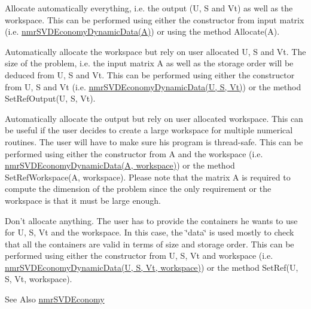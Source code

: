 \begin{DoxyItemize}
\item Allocate automatically everything, i.\-e. the output (U, S and Vt) as well as the workspace. This can be performed using either the constructor from input matrix (i.\-e. \hyperlink{classnmr_s_v_d_economy_dynamic_data}{nmr\-S\-V\-D\-Economy\-Dynamic\-Data(\-A)}) or using the method Allocate(\-A).
\item Automatically allocate the workspace but rely on user allocated U, S and Vt. The size of the problem, i.\-e. the input matrix A as well as the storage order will be deduced from U, S and Vt. This can be performed using either the constructor from U, S and Vt (i.\-e. \hyperlink{classnmr_s_v_d_economy_dynamic_data}{nmr\-S\-V\-D\-Economy\-Dynamic\-Data(\-U, S, Vt)}) or the method Set\-Ref\-Output(\-U, S, Vt).
\item Automatically allocate the output but rely on user allocated workspace. This can be useful if the user decides to create a large workspace for multiple numerical routines. The user will have to make sure his program is thread-\/safe. This can be performed using either the constructor from A and the workspace (i.\-e. \hyperlink{classnmr_s_v_d_economy_dynamic_data}{nmr\-S\-V\-D\-Economy\-Dynamic\-Data(\-A, workspace)}) or the method Set\-Ref\-Workspace(\-A, workspace). Please note that the matrix A is required to compute the dimension of the problem since the only requirement or the workspace is that it must be large enough.
\item Don't allocate anything. The user has to provide the containers he wants to use for U, S, Vt and the workspace. In this case, the \char`\"{}data\char`\"{} is used mostly to check that all the containers are valid in terms of size and storage order. This can be performed using either the constructor from U, S, Vt and workspace (i.\-e. \hyperlink{classnmr_s_v_d_economy_dynamic_data}{nmr\-S\-V\-D\-Economy\-Dynamic\-Data(\-U, S, Vt, workspace)}) or the method Set\-Ref(\-U, S, Vt, workspace).
\end{DoxyItemize}

\begin{DoxySeeAlso}{See Also}
\hyperlink{nmr_s_v_d_economy_8h_a7a5496ff2d20946e8738baac82318603}{nmr\-S\-V\-D\-Economy} 
\end{DoxySeeAlso}


